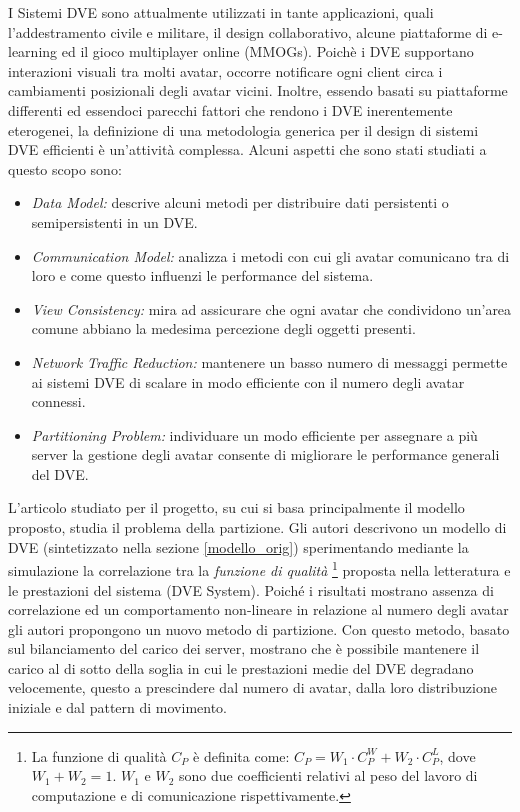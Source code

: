 \documentclass[a4paper, 11pt, oneside]{book}
\theoremstyle{definition}
\theoremstyle{remark}
\begin{document}
I Sistemi DVE sono attualmente utilizzati in tante applicazioni, quali
l'addestramento civile e militare, il design collaborativo, alcune piattaforme
di e-learning ed il gioco multiplayer online (MMOGs).
Poichè i DVE supportano interazioni visuali tra molti avatar, occorre notificare
ogni client circa i cambiamenti posizionali degli avatar vicini.
Inoltre, essendo basati su piattaforme differenti ed essendoci parecchi fattori
che rendono i DVE inerentemente eterogenei, la definizione di una metodologia
generica per il design di sistemi DVE efficienti è un'attività complessa.
Alcuni aspetti che sono stati studiati a questo scopo sono:
\begin{itemize}
\item
\emph{Data Model:} descrive alcuni metodi per distribuire dati persistenti o
semipersistenti in un DVE.
\item
\emph{Communication Model:} analizza i metodi con cui gli avatar comunicano
tra di loro e come questo influenzi le performance del sistema.
\item
\emph{View Consistency:} mira ad assicurare che ogni avatar che condividono
un'area comune abbiano la medesima percezione degli oggetti presenti.
\item
\emph{Network Traffic Reduction:} mantenere un basso numero di messaggi
permette ai sistemi DVE di scalare in modo efficiente con il numero
degli avatar connessi.
\item
\emph{Partitioning Problem:} individuare un modo efficiente per assegnare
a più server la gestione degli avatar consente di migliorare le performance
generali del DVE.
\end{itemize}

L'articolo
\cite{IDVE}
studiato per il progetto, su cui si basa
principalmente il modello proposto,
studia il problema della partizione. Gli autori descrivono un modello di DVE
(sintetizzato nella sezione \ref{modello_orig}) sperimentando mediante
la simulazione la correlazione tra la \emph{funzione di qualità}
\footnote{La funzione di qualità $C_P$ è definita come:
$C_P = W_1 \cdot C_P^W + W_2 \cdot C_P^L$,  dove $W_1 + W_2 = 1$. $W_1$ e $W_2$
sono due coefficienti relativi al peso del lavoro di computazione e di
comunicazione rispettivamente.} proposta nella
letteratura e le prestazioni del sistema (DVE System). Poiché i risultati
mostrano assenza di correlazione ed un comportamento non-lineare in relazione
al numero degli avatar gli autori propongono un nuovo metodo di partizione.
Con questo metodo, basato sul bilanciamento del carico dei server, mostrano
che è possibile mantenere il carico al di sotto della soglia in cui
le prestazioni medie del DVE degradano velocemente, questo a prescindere dal
numero di avatar, dalla loro distribuzione iniziale e dal pattern di movimento.
\end{document}
